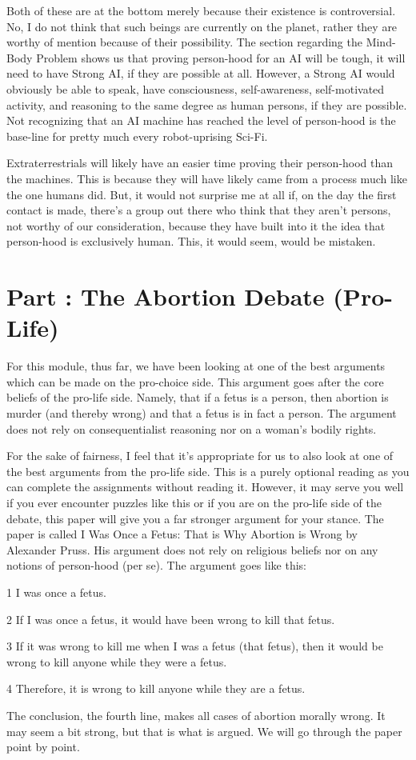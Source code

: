 Both of these are at the bottom merely because their existence is controversial. No, I do not think that such beings are currently on the planet, rather they are worthy of mention because of their possibility. The section regarding the Mind-Body Problem shows us that proving person-hood for an AI will be tough, it will need to have Strong AI, if they are possible at all. However, a Strong AI would obviously be able to speak, have consciousness, self-awareness, self-motivated activity, and reasoning to the same degree as human persons, if they are possible. Not recognizing that an AI machine has reached the level of person-hood is the base-line for pretty much every robot-uprising Sci-Fi. 

Extraterrestrials will likely have an easier time proving their person-hood than the machines. This is because they will have likely came from a process much like the one humans did. But, it would not surprise me at all if, on the day the first contact is made, there's a group out there who think that they aren't persons, not worthy of our consideration, because they have built into it the idea that person-hood is exclusively human. This, it would seem, would be mistaken. 
\chapter{Part \thechapcount: The Abortion Debate (Pro-Life)}\setcounter{seccount}{1}
For this module, thus far, we have been looking at one of the best arguments which can be made on the pro-choice side. This argument goes after the core beliefs of the pro-life side. Namely, that if a fetus is a person, then abortion is murder (and thereby wrong) and that a fetus is in fact a person. The argument does not rely on consequentialist reasoning nor on a woman's bodily rights.

For the sake of fairness, I feel that it's appropriate for us to also look at one of the best arguments from the pro-life side.  This is a purely optional reading as you can complete the assignments without reading it. However, it may serve you well if you ever encounter puzzles like this or if you are on the pro-life side of the debate, this paper will give you a far stronger argument for your stance. The paper is called I Was Once a Fetus: That is Why Abortion is Wrong by Alexander Pruss. His argument does not rely on religious beliefs nor on any notions of person-hood (per se). The argument goes like this:
\begin{earg}
    \item[1 ]I was once a fetus.
    \item[2 ]If I was once a fetus, it would have been wrong to kill that fetus.
    \item[3 ]If it was wrong to kill me when I was a fetus (that fetus), then it would be wrong to kill anyone while they were a fetus.
    \item[4 ]Therefore, it is wrong to kill anyone while they are a fetus.
\end{earg}
The conclusion, the fourth line, makes all cases of abortion morally wrong. It may seem a bit strong, but that is what is argued. We will go through the paper point by point.
